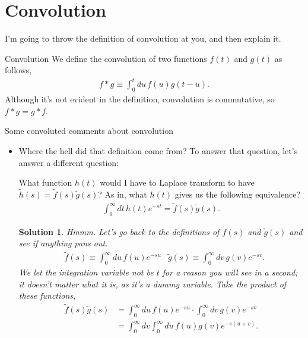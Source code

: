 \documentclass[11pt]{article}
\newtheorem*{solution}{Solution}
\theoremstyle{mystyle}
\begin{document}
\section{Convolution}

I'm going to throw the definition of
convolution at you, and then explain it.
\begin{psidea}{Convolution}{}
    We define the convolution of two functions $f(t)$
    and $g(t)$ as follows,
    \begin{align*}
        f * g \equiv \int_0^t du \, f(u) g(t - u).
    \end{align*}
    Although it's not evident in the definition,
    convolution is commutative, so $f * g = g * f$.
\end{psidea}

\begin{psremark}{Some convoluted comments about convolution}{}
    \begin{itemize}
        \item Where the hell did that definition come from? To answer
        that question, let's answer a different question:
        \begin{hwproblem}
            What function $h(t)$ would I have to Laplace 
            transform to have $\tilde{h}(s) = \tilde{f}(s)\tilde{g}(s)$?
            As in, what $h(t)$ gives us the following equivalence?
            \begin{align*}
                \int_0^\infty dt \, h(t) e^{-st} = \tilde{f}(s)\tilde{g}(s).
            \end{align*}
        \end{hwproblem}
        \begin{solution}
        Hmmm. Let's go back to the definitions of $\tilde{f}(s)$ and $\tilde{g}(s)$
        and see if anything pans out.
        \begin{align*}
            & \tilde{f}(s) \equiv \int_0^\infty du \, f(u)e^{-su} & \tilde{g}(s) \equiv \int_0^\infty dv \, g(v)e^{-sv}. 
        \end{align*}
        We let the integration variable not be $t$ for a reason you will
        see in a second; it doesn't matter what it is, as it's a dummy variable.
        Take the product of these functions,
        \begin{align*}
            \tilde{f}(s)\tilde{g}(s) & = \int_0^\infty du \, f(u)e^{-su} \cdot \int_0^\infty dv \, g(v)e^{-sv}\\
            & = \int_0^\infty dv \int_0^\infty du \, f(u)g(v)e^{-s(u + v)}.

\end{align*}
\end{solution}
\end{itemize}
\end{psremark}
\end{document}
